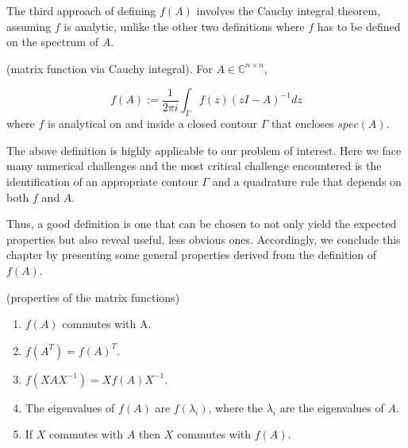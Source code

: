 The third approach of defining $f(A)$ involves the Cauchy integral theorem, assuming $f$ is analytic, unlike the other two definitions where $f$ has to be defined on the spectrum of $A$.

\begin{definition}
    \label{def:2.7}
    \cite{8}(matrix function via Cauchy integral). For $A \in \mathbb{C}^{n \times n}$,

    \begin{equation}
        f(A) := \frac{1}{2\pi i} \int_\Gamma f(z)(zI - A)^{-1}dz
        \label{eq:2.7}
    \end{equation}
    where $f$ is analytical on and inside a closed contour $\Gamma$ that encloses $spec(A)$.
\end{definition}

The above definition is highly applicable to our problem of interest. Here we face many numerical challenges and the most critical challenge encountered is the identification of an appropriate contour $\Gamma$ and a quadrature rule that depends on both $f$ and $A$.

Thus, a good definition is one that can be chosen to not only yield the expected properties but also reveal useful, less obvious ones. Accordingly, we conclude this chapter by presenting some general properties derived from the definition of $f(A)$.

\begin{remark}
\label{rem:2.8}
    (properties of the matrix functions)\cite{8}
    \begin{enumerate}
        \item $f(A)$ commutes with A.
        \item $f(A^{T})=f(A)^{T}$.
        \item $f(XAX^{-1})=Xf(A)X^{-1}$.
        \item The eigenvalues of $f(A)$ are $f(\lambda_{i})$, where the $\lambda_{i}$ are the eigenvalues of $A$.
        \item If $X$ commutes with $A$ then $X$ commutes with $f(A)$.
    \end{enumerate}
\end{remark}